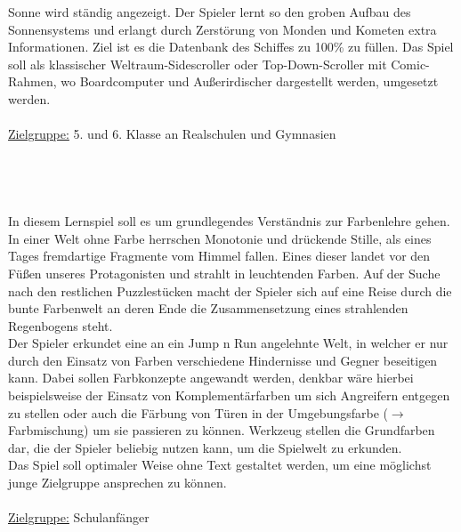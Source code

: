 \documentclass[10pt,a4paper,notitlepage]{report}
\begin{document}
	Sonne wird ständig angezeigt. Der Spieler lernt so den groben Aufbau des
	Sonnensystems und erlangt durch Zerstörung von Monden und Kometen extra
	Informationen. Ziel ist es die Datenbank des Schiffes zu 100\% zu füllen.
	Das Spiel soll als klassischer Weltraum-Sidescroller oder Top-Down-Scroller
	mit Comic-Rahmen, wo Boardcomputer und Außerirdischer dargestellt werden,
	umgesetzt werden.\\
	\\
	\underline{Zielgruppe:} 5. und 6. Klasse an Realschulen und Gymnasien\\
	\\
	\\
	\\
	\\
	\Text
		In diesem Lernspiel soll es um grundlegendes Verständnis zur Farbenlehre gehen. \\
	In einer Welt ohne Farbe herrschen Monotonie und drückende Stille, als eines Tages 
	fremdartige Fragmente vom Himmel fallen. Eines dieser landet vor den Füßen unseres 
	Protagonisten und strahlt in leuchtenden Farben. Auf der Suche nach den restlichen 
	Puzzlestücken macht der Spieler sich auf eine Reise durch die bunte Farbenwelt an 
	deren Ende die Zusammensetzung eines strahlenden Regenbogens steht.\\
		Der Spieler erkundet eine an ein Jump n Run angelehnte Welt, in welcher er nur 
	durch den Einsatz von Farben verschiedene Hindernisse und Gegner beseitigen kann. 
	Dabei sollen Farbkonzepte angewandt werden, denkbar wäre hierbei beispielsweise 
	der Einsatz von Komplementärfarben um sich Angreifern entgegen zu stellen oder 
	auch die Färbung von Türen in der Umgebungsfarbe ($\rightarrow$ Farbmischung) um sie passieren 
	zu können. Werkzeug stellen die Grundfarben dar, die der Spieler beliebig nutzen kann, 
	um die Spielwelt zu erkunden.\\
		Das Spiel soll optimaler Weise ohne Text gestaltet werden, um eine möglichst junge 
	Zielgruppe ansprechen zu können.\\
	\\
	\underline{Zielgruppe:} Schulanfänger\\
	\\
	\\
	\\
	\\
	\\
	\Fusszeile
\end{document}
